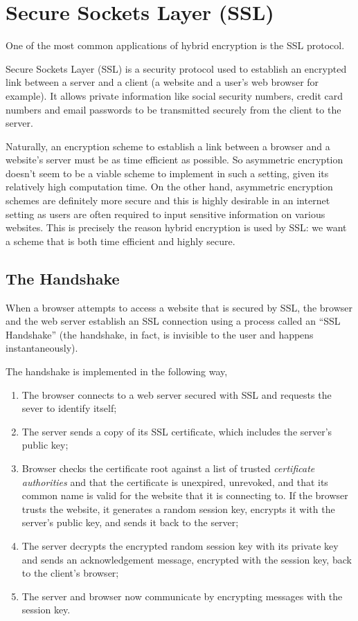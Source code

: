 \section{Secure Sockets Layer (SSL)}

One of the most common applications of hybrid encryption is the SSL protocol.

Secure Sockets Layer (SSL) is a security protocol used to establish an encrypted link between a server and a client (a website and a user's web browser for example). It allows private information like social security numbers, credit card numbers and email passwords to be transmitted securely from the client to the server.

Naturally, an encryption scheme to establish a link between a browser and a website's server must be as time efficient as possible. So asymmetric encryption doesn't seem to be a viable scheme to implement in such a setting, given its relatively high computation time. On the other hand, asymmetric encryption schemes are definitely more secure and this is highly desirable in an internet setting as users are often required to input sensitive information on various websites. This is precisely the reason hybrid encryption is used by SSL: we want a scheme that is both time efficient and highly secure.

\subsection{The Handshake}

\cite{digicert}When a browser attempts to access a website that is secured by SSL, the browser and the web server establish an SSL connection using a process called an “SSL Handshake” (the handshake, in fact, is invisible to the user and happens instantaneously).

The handshake is implemented in the following way,
\begin{enumerate}
\item The browser connects to a web server secured with SSL and requests the sever to identify itself;
\item The server sends a copy of its SSL certificate, which includes the server's public key;
\item Browser checks the certificate root against a list of trusted \textit{certificate authorities} and that the certificate is unexpired, unrevoked, and that its common name is valid for the website that it is connecting to. If the browser trusts the website, it generates a random session key, encrypts it with the server's public key, and sends it back to the server;
\item The server decrypts the encrypted random session key with its private key and sends an acknowledgement message, encrypted with the session key, back to the client's browser;
\item The server and browser now communicate by encrypting messages with the session key.
\end{enumerate}  %

\label{sec:ssl}
